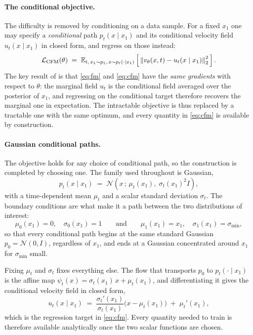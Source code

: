 \paragraph{The conditional objective.} The difficulty is removed by
conditioning on a data sample. For a fixed $x_1$ one may specify a
\emph{conditional} path $p_t(x \mid x_1)$ and its conditional velocity
field $u_t(x \mid x_1)$ in closed form, and regress on those instead:
\begin{equation}
  \label{eq:cfm}
  \mathcal{L}_{\text{CFM}}(\theta) \;=\; \mathbb{E}_{t,\,x_1 \sim p_1,\,x \sim p_t(\cdot \mid x_1)}
  \left[\, \left\lVert v_\theta(x,t) - u_t(x \mid x_1) \right\rVert_2^2 \,\right].
\end{equation}
The key result of \citet{lipman2023flowmatching} is that \cref{eq:fm} and
\cref{eq:cfm} have the \emph{same gradients} with respect to $\theta$: the marginal field $u_t$ is the
conditional field averaged over the posterior of $x_1$, and regressing on
the conditional target therefore recovers the marginal one in expectation.
The intractable objective is thus replaced by a tractable one with the same
optimum, and every quantity in \cref{eq:cfm} is available by construction.

\paragraph{Gaussian conditional paths.} The objective holds for any choice
of conditional path, so the construction is completed by choosing one. The
family used throughout is Gaussian,
\begin{equation}
  \label{eq:gaussian-path}
  p_t(x \mid x_1) \;=\; \mathcal{N}\!\left(x \,;\, \mu_t(x_1),\; \sigma_t(x_1)^2 I\right),
\end{equation}
with a time-dependent mean $\mu_t$ and a scalar standard deviation
$\sigma_t$. The boundary conditions are what make it a path between the two
distributions of interest:
\begin{equation}
  \label{eq:path-boundary}
  \mu_0(x_1) = 0, \quad \sigma_0(x_1) = 1
  \qquad\text{and}\qquad
  \mu_1(x_1) = x_1, \quad \sigma_1(x_1) = \sigma_{\min},
\end{equation}
so that every conditional path begins at the same standard Gaussian
$p_0 = \mathcal{N}(0, I)$, regardless of $x_1$, and ends at a Gaussian
concentrated around $x_1$ for $\sigma_{\min}$ small.

Fixing $\mu_t$ and $\sigma_t$ fixes everything else. The flow that
transports $p_0$ to $p_t(\cdot \mid x_1)$ is the affine map
$\psi_t(x) = \sigma_t(x_1)\,x + \mu_t(x_1)$, and differentiating it gives
the conditional velocity field in closed form,
\begin{equation}
  \label{eq:gaussian-velocity}
  u_t(x \mid x_1) \;=\; \frac{\sigma_t'(x_1)}{\sigma_t(x_1)}\Big(x - \mu_t(x_1)\Big) \;+\; \mu_t'(x_1),
\end{equation}
which is the regression target in \cref{eq:cfm}. Every quantity needed to
train is therefore available analytically once the two scalar functions are
chosen.

